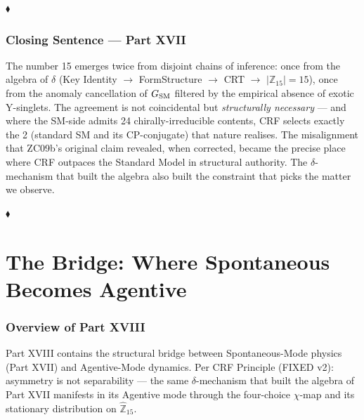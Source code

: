 \documentclass[12pt, a4paper]{article}
\begin{document}
\noindent\hfill$\blacklozenge$


\section*{Closing Sentence — Part XVII}

The number 15 emerges twice from disjoint chains of inference: once
from the algebra of $\delta$ (Key Identity $\to$ FormStructure $\to$
CRT $\to$ $|\mathbb{Z}_{15}| = 15$), once from the anomaly cancellation
of $G_{\rm SM}$ filtered by the empirical absence of exotic
Y-singlets. The agreement is not coincidental but \emph{structurally
necessary} --- and where the SM-side admits 24 chirally-irreducible
contents, CRF selects exactly the 2 (standard SM and its CP-conjugate)
that nature realises. The misalignment that ZC09b's original claim
revealed, when corrected, became the precise place where CRF outpaces
the Standard Model in structural authority. The $\delta$-mechanism
that built the algebra also built the constraint that picks the
matter we observe.

\noindent\hfill$\blacklozenge$

\part{The Bridge: Where Spontaneous Becomes Agentive}
\label{part:XVIII}

\section*{Overview of Part XVIII}

Part XVIII contains the structural bridge between Spontaneous-Mode
physics (Part XVII) and Agentive-Mode dynamics. Per CRF Principle
(FIXED v2): asymmetry is not separability --- the same $\delta$-mechanism
that built the algebra of Part XVII manifests in its Agentive mode
through the four-choice $\chi$-map and its stationary distribution
on $\widehat{\mathbb{Z}}_{15}$.
\end{document}
